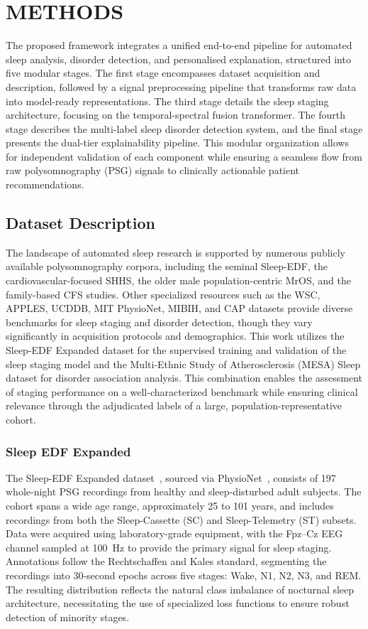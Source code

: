 \documentclass{ieeetj}
\begin{document}
\section{METHODS}
The proposed framework integrates a unified end-to-end pipeline for automated sleep analysis, disorder detection, and personalised explanation, structured into five modular stages. The first stage encompasses dataset acquisition and description, followed by a signal preprocessing pipeline that transforms raw data into model-ready representations. The third stage details the sleep staging architecture, focusing on the temporal-spectral fusion transformer. The fourth stage describes the multi-label sleep disorder detection system, and the final stage presents the dual-tier explainability pipeline. This modular organization allows for independent validation of each component while ensuring a seamless flow from raw polysomnography (PSG) signals to clinically actionable patient recommendations.

\subsection{Dataset Description}
The landscape of automated sleep research is supported by numerous publicly available polysomnography corpora, including the seminal Sleep-EDF, the cardiovascular-focused SHHS, the older male population-centric MrOS, and the family-based CFS studies. Other specialized resources such as the WSC, APPLES, UCDDB, MIT PhysioNet, MIBIH, and CAP datasets provide diverse benchmarks for sleep staging and disorder detection, though they vary significantly in acquisition protocols and demographics. This work utilizes the Sleep-EDF Expanded dataset for the supervised training and validation of the sleep staging model and the Multi-Ethnic Study of Atherosclerosis (MESA) Sleep dataset for disorder association analysis. This combination enables the assessment of staging performance on a well-characterized benchmark while ensuring clinical relevance through the adjudicated labels of a large, population-representative cohort.

\subsubsection{Sleep EDF Expanded}
The Sleep-EDF Expanded dataset~\cite{sleepedfx}, sourced via PhysioNet~\cite{physiobank}, consists of 197 whole-night PSG recordings from healthy and sleep-disturbed adult subjects. The cohort spans a wide age range, approximately 25 to 101 years, and includes recordings from both the Sleep-Cassette (SC) and Sleep-Telemetry (ST) subsets. Data were acquired using laboratory-grade equipment, with the Fpz--Cz EEG channel sampled at 100~Hz to provide the primary signal for sleep staging. Annotations follow the Rechtschaffen and Kales standard, segmenting the recordings into 30-second epochs across five stages: Wake, N1, N2, N3, and REM. The resulting distribution reflects the natural class imbalance of nocturnal sleep architecture, necessitating the use of specialized loss functions to ensure robust detection of minority stages.
\end{document}
